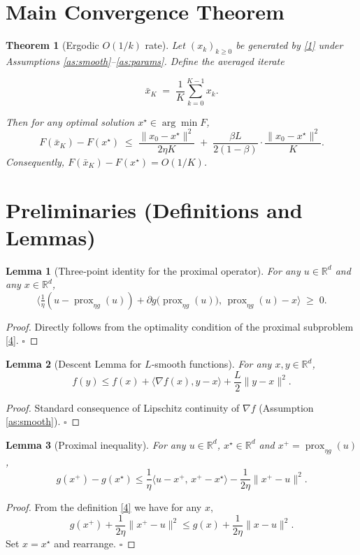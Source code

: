 \documentclass{article}
\newtheorem{theorem}{Theorem}
\newtheorem{lemma}{Lemma}
\newcommand{\prox}{\operatorname{prox}}
\begin{document}
\section*{Main Convergence Theorem}
\begin{theorem}[Ergodic $O(1/k)$ rate]\label{thm:rate}
Let $(x_k)_{k\ge0}$ be generated by \eqref{1} under Assumptions \ref{as:smooth}–\ref{as:params}.  
Define the averaged iterate  

\[
\bar{x}_K \;=\; \frac{1}{K}\sum_{k=0}^{K-1}x_{k}.
\]

Then for any optimal solution $x^\star\in\arg\min F$,
\[
F(\bar{x}_K)-F(x^\star)\;\le\;
\frac{\|x_0-x^\star\|^2}{2\eta K}\;+\;\frac{\beta L}{2(1-\beta)}\cdot\frac{\|x_0-x^\star\|^2}{K}.
\tag{6}
\]
Consequently, $F(\bar{x}_K)-F(x^\star)=O(1/K)$.
\end{theorem}

\section*{Preliminaries (Definitions and Lemmas)}
\begin{lemma}[Three‑point identity for the proximal operator]\label{lem:prox}
For any $u\in\mathbb{R}^d$ and any $x\in\mathbb{R}^d$,
\[
\bigl\langle \tfrac{1}{\eta}(u-\prox_{\eta g}(u))+\partial g\bigl(\prox_{\eta g}(u)\bigr),\,
\prox_{\eta g}(u)-x\bigr\rangle \;\ge\;0 .
\tag{7}
\]
\end{lemma}
\begin{proof}
Directly follows from the optimality condition of the proximal subproblem \eqref{4}. \hfill $\square$
\end{proof}

\begin{lemma}[Descent Lemma for $L$‑smooth functions]\label{lem:descent}
For any $x,y\in\mathbb{R}^d$,
\[
f(y)\le f(x)+\langle \nabla f(x),y-x\rangle+\frac{L}{2}\|y-x\|^2 .
\tag{8}
\]
\end{lemma}
\begin{proof}
Standard consequence of Lipschitz continuity of $\nabla f$ (Assumption \ref{as:smooth}). \hfill $\square$
\end{proof}

\begin{lemma}[Proximal inequality]\label{lem:prox-ineq}
For any $u\in\mathbb{R}^d$, $x^\star\in\mathbb{R}^d$ and $x^{+}= \prox_{\eta g}(u)$,
\[
g(x^{+})-g(x^\star) \le
\frac{1}{\eta}\langle u-x^{+},\,x^{+}-x^\star\rangle
-\frac{1}{2\eta}\|x^{+}-u\|^{2}.
\tag{9}
\]
\end{lemma}
\begin{proof}
From the definition \eqref{4} we have for any $x$,
\[
g(x^{+})+\frac{1}{2\eta}\|x^{+}-u\|^{2}
\le g(x)+\frac{1}{2\eta}\|x-u\|^{2}.
\]
Set $x=x^\star$ and rearrange. \hfill $\square$
\end{proof}
\end{document}

